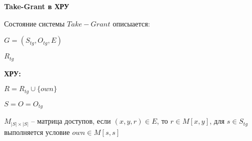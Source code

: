\textbf{Take-Grant в ХРУ}

Состояние системы $Take-Grant$ описыается:
\begin{enumerate*}
	\item $G=(S_{tg}, O_{tg}, E)$
	\item $R_{tg}$
\end{enumerate*}

\textbf{ХРУ:}
\begin{enumerate*}
	\item $R = R_{tg} \cup \{own\}$
	\item $S = O = O_{tg}$
	\item $M_{|S| \times |S|}$ -- матрица доступов, если $(x,y,r) \in E$, то $r \in M[x,y]$, для $s \in S_{tg}$ выполняется условие $own \in M[s,s]$
\end{enumerate*}

